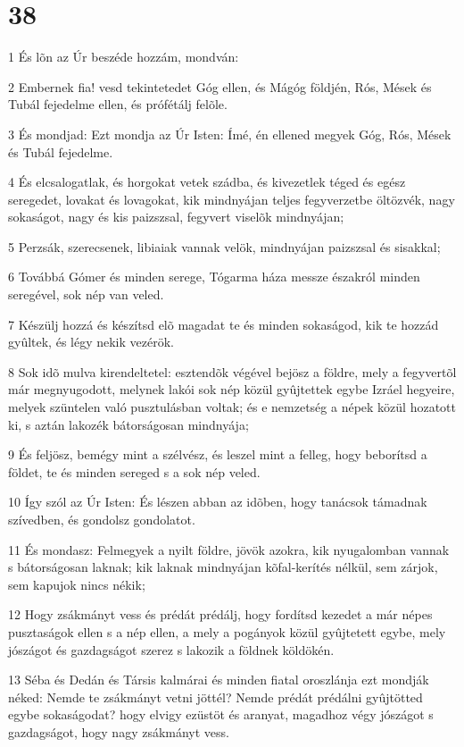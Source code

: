 \chapter{38}

\par 1 És lõn az Úr beszéde hozzám, mondván:
\par 2 Embernek fia! vesd tekintetedet Góg ellen, és Mágóg földjén, Rós, Mések és Tubál fejedelme ellen, és prófétálj felõle.
\par 3 És mondjad: Ezt mondja az Úr Isten: Ímé, én ellened megyek Góg, Rós, Mések és Tubál fejedelme.
\par 4 És elcsalogatlak, és horgokat vetek szádba, és kivezetlek téged és egész seregedet, lovakat és lovagokat, kik mindnyájan teljes fegyverzetbe öltözvék, nagy sokaságot, nagy és kis paizszsal, fegyvert viselõk mindnyájan;
\par 5 Perzsák, szerecsenek, libiaiak vannak velök, mindnyájan paizszsal és sisakkal;
\par 6 Továbbá Gómer és minden serege, Tógarma háza messze északról minden seregével, sok nép van veled.
\par 7 Készülj hozzá és készítsd elõ magadat te és minden sokaságod, kik te hozzád gyûltek, és légy nekik vezérök.
\par 8 Sok idõ mulva kirendeltetel: esztendõk végével bejösz a földre, mely a fegyvertõl már megnyugodott, melynek lakói sok nép közül gyûjtettek egybe Izráel hegyeire, melyek szüntelen való pusztulásban voltak; és e nemzetség a népek közül hozatott ki, s aztán lakozék bátorságosan mindnyája;
\par 9 És feljösz, bemégy mint a szélvész, és leszel mint a felleg, hogy beborítsd a földet, te és minden sereged s a sok nép veled.
\par 10 Így szól az Úr Isten: És lészen abban az idõben, hogy tanácsok támadnak szívedben, és gondolsz gondolatot.
\par 11 És mondasz: Felmegyek a nyilt földre, jövök azokra, kik nyugalomban vannak s bátorságosan laknak; kik laknak mindnyájan kõfal-kerítés nélkül, sem zárjok, sem kapujok nincs nékik;
\par 12 Hogy zsákmányt vess és prédát prédálj, hogy fordítsd kezedet a már népes pusztaságok ellen s a nép ellen, a mely a pogányok közül gyûjtetett egybe, mely jószágot és gazdagságot szerez s lakozik a földnek köldökén.
\par 13 Séba és Dedán és Társis kalmárai és minden fiatal oroszlánja ezt mondják néked: Nemde te zsákmányt vetni jöttél? Nemde prédát prédálni gyûjtötted egybe sokaságodat? hogy elvigy ezüstöt és aranyat, magadhoz végy jószágot s gazdagságot, hogy nagy zsákmányt vess.
